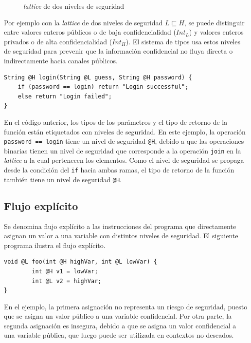 	\begin{figure}[ht]
		\centering
		\caption{\textit{lattice} de dos niveles de seguridad}
	\end{figure}


	Por ejemplo con la \textit{lattice} de dos niveles de seguridad $L \sqsubseteq H$, se puede distinguir entre valores enteros públicos o de baja confidencialidad ($Int_L$) y valores enteros privados o de alta confidencialidad ($Int_H$). El sistema de tipos usa estos niveles de seguridad para prevenir que la información confidencial no fluya directa o indirectamente hacia canales públicos\cite{volpanoAl:S96}. %

	\begin{lstlisting}
String @H login(String @L guess, String @H password) {
	if (password == login) return "Login successful";
	else return "Login failed";
}
	\end{lstlisting}

	En el código anterior, los tipos de los parámetros y el tipo de retorno de la función están etiquetados con niveles de seguridad. En este ejemplo, la operación \texttt{password == login} tiene un nivel de seguridad \texttt{@H}, debido a que las operaciones binarias tienen un nivel de seguridad que corresponde a la operación \texttt{join} en la \textit{lattice} a la cual pertenecen los elementos. Como el nivel de seguridad se propaga desde la condición del \texttt{if} hacia ambas ramas, el tipo de retorno de la función también tiene un nivel de seguridad \texttt{@H}.

	\subsection{Flujo explícito}
	Se denomina flujo explícito a las instrucciones del programa que directamente asignan un valor a una variable con distintos niveles de seguridad. El siguiente programa ilustra el flujo explícito.

	\begin{lstlisting}
void @L foo(int @H highVar, int @L lowVar) {
		int @H v1 = lowVar;
		int @L v2 = highVar;
}
	\end{lstlisting}

	En el ejemplo, la primera asignación no representa un riesgo de seguridad, puesto que se asigna un valor público a una variable confidencial. Por otra parte, la segunda asignación es insegura, debido a que se asigna un valor confidencial a una variable pública, que luego puede ser utilizada en contextos no deseados.

